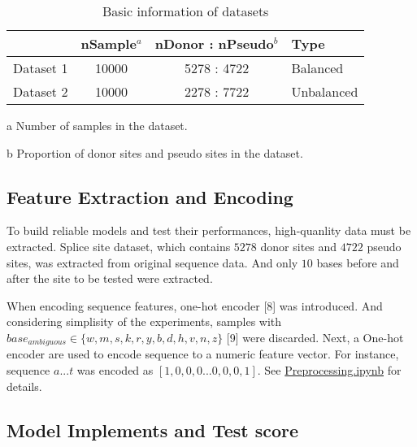 \documentclass[11pt]{article}
\begin{document}
\begin{table*}[h] %
\centering
\caption{Basic information of datasets} 
\begin{threeparttable}
\begin{tabular}{cccl}
	\toprule
	{} &  nSample$^a$ & nDonor : nPseudo$^b$ &        Type \\
	\midrule
	Dataset 1 &    10000 &      5278 : 4722 &    Balanced \\
	Dataset 2 &    10000 &      2278 : 7722 &  Unbalanced \\
	\bottomrule
\end{tabular}
 \begin{tablenotes}
	\footnotesize
	\item[a] Number of samples in the dataset.
	\item[b] Proportion of donor sites and pseudo sites in the dataset.
\end{tablenotes}
\end{threeparttable}
\end{table*}




    \hypertarget{feature-extraction-and-encoding}{%
\subsection{Feature Extraction and
Encoding}\label{feature-extraction-and-encoding}}

To build reliable models and test their performances, high-quanlity data
must be extracted. Splice site dataset, which contains \(5278\) donor
sites and \(4722\) pseudo sites, was extracted from original sequence
data. And only \(10\) bases before and after the site to be tested were
extracted.

When encoding sequence features, one-hot encoder {[}8{]} was introduced.
And considering simplisity of the experiments, samples with
\(base_{ambiguous} \in \{w,m,s,k,r,y,b,d,h,v,n,z\}\) {[}9{]} were
discarded. Next, a One-hot encoder are used to encode sequence to a
numeric feature vector. For instance, sequence \(a...t\) was encoded as
\([1,0,0,0...0,0,0,1]\). See
\href{https://github.com/AdeBC/GSSR/blob/master/Source/Preprocessing.ipynb}{Preprocessing.ipynb}
for details.

    \hypertarget{model-implements-and-test-core}{%
\subsection{Model Implements and Test
score}\label{model-implements-and-test-score}}
\end{document}
